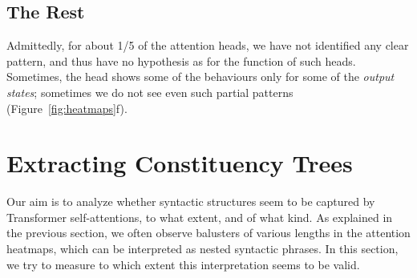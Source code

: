 \documentclass[11pt,a4paper]{article}
\newcommand{\states}{\emph{output states}\xspace}
\def\RR#1{{\color{blue}RR: \it #1}}
\def\DM#1{{\color{red}DM: \it #1}}
\def\JL#1{{\color{magenta}JL: \it #1}}
\def\JL#1{}
\def\RR#1{}
\def\DM#1{}
\begin{document}

\subsection{The Rest}

Admittedly, for about 1/5 of the attention heads, we have not identified any clear pattern, and thus have no hypothesis as for the function of such heads.
Sometimes, the head shows some of the behaviours only for some of the \states; sometimes we do not see even such partial patterns (Figure~\ref{fig:heatmaps}f).

\DM{TODO: Quantitative evaluation: try to say how many patterns of type X are present for lang pair Y-Z
(and potentially also try to interpret this)}

\section{Extracting Constituency Trees}
\label{sec:parsing}


Our aim is to analyze whether syntactic structures seem to be captured by Transformer self-attentions, to what extent, and of what kind.
As explained in the previous section, we often observe balusters of various lengths in the attention heatmaps, which can be interpreted as nested syntactic phrases.
In this section, we try to measure
to which extent this interpretation seems to be valid.
\end{document}
